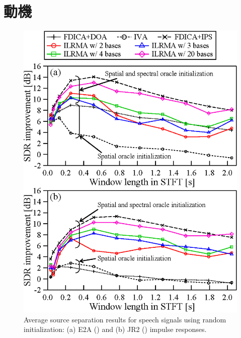 \section{動機}
\label{sec:moti}
\begin{figure}[t]
    \begin{center}
        \includegraphics[width=0.8\columnwidth]{figures/SpeechE2AJR2_opt12+note.eps}
    \end{center}
    \vspace{-8pt}
	\caption{Average source separation results for speech signals using random initialization: (a) E2A () and (b) JR2 () impulse responses. }
	\label{fig:kitamura_es}
\end{figure}

